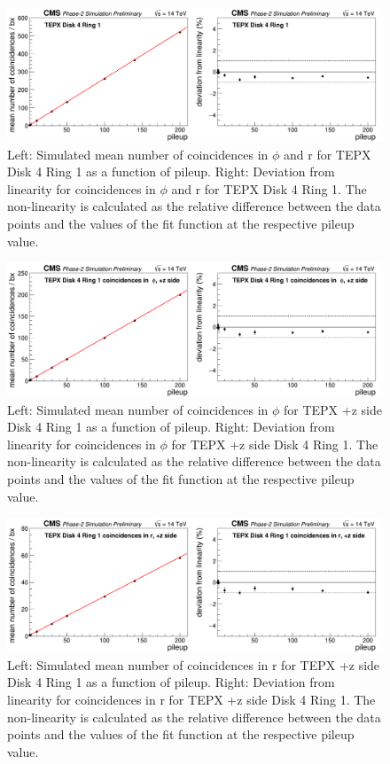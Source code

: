 \begin{figure}[H]
  \centering
  \includegraphics[width=1\columnwidth]{./totalcoincidencesD4R1.png}
  \caption{Left: Simulated mean number of coincidences in $\phi$ and r for TEPX Disk 4 Ring 1 as a function of pileup. Right: Deviation from linearity for coincidences in $\phi$ and r for TEPX Disk 4 Ring 1. The non-linearity is calculated as the relative difference between the data points and the values of the fit function at the respective pileup value.}
  \label{fig:CMS}
\end{figure}



\begin{figure}[H]
  \centering
  \includegraphics[width=1\columnwidth]{./coincidencesinphiD4R1z+.png}
  \caption{Left: Simulated mean number of coincidences in $\phi$ for TEPX +z side Disk 4 Ring 1 as a function of pileup. Right: Deviation from linearity for coincidences in $\phi$ for TEPX +z side Disk 4 Ring 1. The non-linearity is calculated as the relative difference between the data points and the values of the fit function at the respective pileup value.}
  \label{fig:CMS}
\end{figure}



\begin{figure}[H]
  \centering
  \includegraphics[width=1\columnwidth]{./coincidencesinrD4R1z+.png}
  \caption{Left: Simulated mean number of coincidences in r for TEPX +z side Disk 4 Ring 1 as a function of pileup. Right: Deviation from linearity for coincidences in r for TEPX +z side Disk 4 Ring 1. The non-linearity is calculated as the relative difference between the data points and the values of the fit function at the respective pileup value.}
  \label{fig:CMS}
\end{figure}


